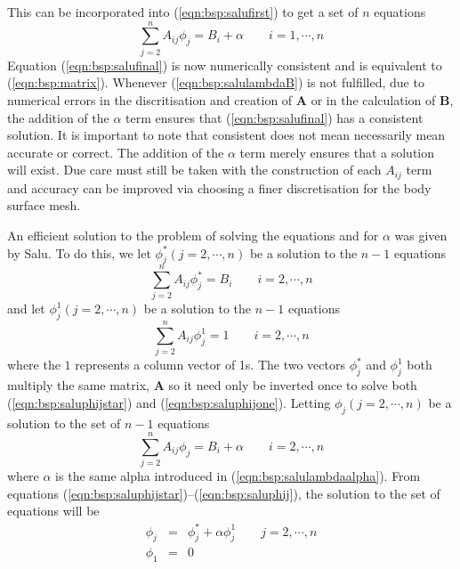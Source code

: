 This can be incorporated into (\ref{eqn:bsp:salufirst}) to get a set of $n$
equations
\begin{equation}
\label{eqn:bsp:salufinal}
\sum_{j=2}^n A_{ij} \phi_j = B_i + \alpha \quad\quad  i = 1,\cdots, n
\end{equation}
Equation (\ref{eqn:bsp:salufinal}) is now numerically consistent and is
equivalent to (\ref{eqn:bsp:matrix}).
Whenever (\ref{eqn:bsp:salulambdaB}) is not fulfilled, due to numerical errors
in the discritisation and creation of $\textbf{A}$ or in the calculation of
$\textbf{B}$, the addition of the $\alpha$ term ensures that
(\ref{eqn:bsp:salufinal}) has a consistent solution.
It is important to note that consistent does not mean necessarily mean accurate
or correct.
The addition of the $\alpha$ term merely ensures that a solution will exist.
Due care must still be taken with the construction of each $A_{ij}$ term and
accuracy can be improved via choosing a finer discretisation for the body
surface mesh.

An efficient solution to the problem of solving the equations and for $\alpha$
was given by Salu.
To do this, we let $\phi_j^* \left(j=2,\cdots,n\right)$ be a solution to the
$n-1$ equations
\begin{equation}
\label{eqn:bsp:saluphijstar}
\sum_{j=2}^n A_{ij} \phi_j^* = B_i \quad\quad  i = 2,\cdots, n
\end{equation}
and let $\phi_j^1 \left(j=2,\cdots,n\right)$ be a solution to the $n-1$
equations
\begin{equation}
\label{eqn:bsp:saluphijone}
\sum_{j=2}^n A_{ij} \phi_j^1 = 1 \quad\quad  i = 2,\cdots, n
\end{equation}
where the $1$ represents a column vector of 1s.
The two vectors $\phi_j^*$ and $\phi_j^1$ both multiply the same matrix,
$\mathbf{A}$ so it need only be inverted once to solve both
(\ref{eqn:bsp:saluphijstar}) and (\ref{eqn:bsp:saluphijone}).
Letting $\phi_j \left(j=2,\cdots,n\right)$ be a solution to the set of $n-1$
equations
\begin{equation}
\label{eqn:bsp:saluphij}
\sum_{j=2}^n A_{ij} \phi_j = B_i + \alpha \quad\quad  i = 2,\cdots, n
\end{equation}
where $\alpha$ is the same alpha introduced in (\ref{eqn:bsp:salulambdaalpha}).
From equations (\ref{eqn:bsp:saluphijstar})--(\ref{eqn:bsp:saluphij}), the
solution to the set of equations will be
\begin{eqnarray}
\label{eqn:bsp:salusolution}
\phi_j&=&\phi_j^* + \alpha\phi_j^1 \quad\quad  j = 2,\cdots, n \nonumber\\
\phi_1&=&0
\end{eqnarray}

